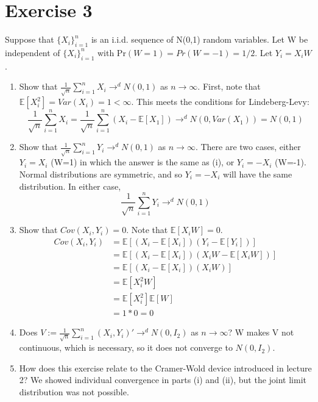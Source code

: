 \documentclass[]{article}
\newcommand{\sumin}{\sum\limits_{i=1}^n} %
\newcommand{\E}{\mathbb{E}}
\newcommand{\fix} [1] {\textbf{\textcolor{blue}{#1}}} %
\begin{document}
\section*{Exercise 3} %
Suppose that $\{X_i\}_{i=1}^n $ is an i.i.d. sequence of N(0,1) random variables. Let W be independent of $\{X_i\}_{i=1}^n $ with Pr$(W=1)= Pr(W=-1)=1/2$. Let $Y_i = X_iW$. 

\begin{enumerate}[label = (\roman*)]

\item Show that $\frac{1}{\sqrt{n}} \sumin X_i \rightarrow^d N(0,1)$ as $n \rightarrow \infty$.
First, note that $\E[X_i^2] = Var(X_i) = 1 < \infty$. This meets the conditions for Lindeberg-Levy:
\[\frac{1}{\sqrt{n}} \sumin X_i = \frac{1}{\sqrt{n}}\sumin(X_i - \E[X_1]) 
\rightarrow^d N(0,Var(X_1)) = N(0,1)\]

\item Show that $\frac{1}{\sqrt{n}} \sumin Y_i \rightarrow^d N(0,1)$ as $n \rightarrow \infty$.
There are two cases, either $Y_i = X_i$ (W=1) in which the answer is the same as (i), or $Y_i = -X_i$ (W=-1). Normal distributions are symmetric, and so $Y_i = -X_i$ will have the same distribution. In either case, 
\[\frac{1}{\sqrt{n}} \sumin Y_i \rightarrow^d N(0,1)\]


\item Show that $Cov(X_i,Y_i) =0$.
Note that $\E[X_iW] = 0$.
\begin{align*}
Cov(X_i,Y_i) & = \E[(X_i - \E[X_i])(Y_i-\E[Y_i])]
\\
& = \E[(X_i - \E[X_i])(X_iW-\E[X_iW])]
\\
& = \E[(X_i - \E[X_i])(X_iW)]
\\
& = \E[ X_i^2W]
\\ 
& = \E[X_i^2]\E[W] 
\\
& = 1*0 = 0 
\end{align*}

\item Does $V := \frac{1}{\sqrt{n}} \sumin (X_i,Y_i)'\rightarrow^d N(0,I_2)$ as $n \rightarrow \infty$? W makes V not continuous, which is necessary, so it does not converge to $N(0,I_2)$.


\item How does this exercise relate to the Cramer-Wold device introduced in lecture 2?
We showed individual convergence in parts (i) and (ii), but the joint limit distribution was not possible.

\end{enumerate}
 
\end{document}
